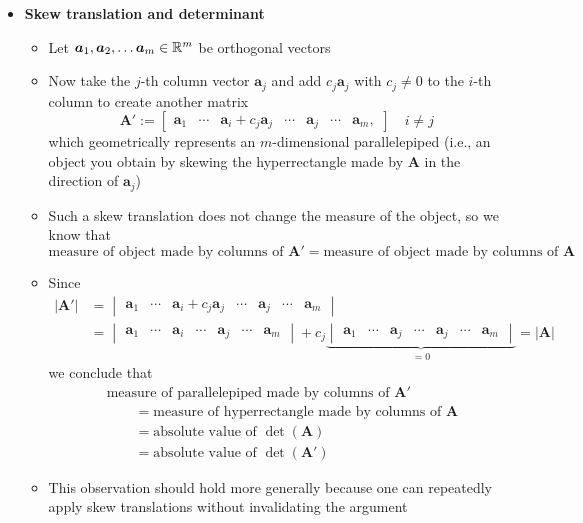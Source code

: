 \documentclass[12pt,a4paper]{article}
\begin{document}
\begin{itemize}
\item \textbf{Skew translation and determinant}
  \begin{itemize}
  \item Let $\bm{a}_{1}, \bm{a}_{2},\ldots \bm{a}_{m} \in \mathbb{R}^{m}$ be orthogonal vectors
  \item Now take the $j$-th column vector $\bm{a}_{j}$ and add $c_{j}\bm{a}_{j}$ with $c_{j}\neq 0$ to the $i$-th column to create another matrix
    \begin{equation}\nonumber%
      \bm{A}' := 
    \begin{bmatrix}
      \bm{a}_{1} & \cdots & \bm{a}_{i} + c_{j}\bm{a}_{j} & \cdots & \bm{a}_{j} & \cdots & \bm{a}_{m},
    \end{bmatrix}
    \quad i \neq j
    \end{equation}
    which geometrically represents an $m$-dimensional parallelepiped (i.e., an object you obtain by skewing the hyperrectangle made by $\bm{A}$ in the direction of $\bm{a}_{j}$)
  \item Such a skew translation does not change the measure of the object, so we know that
    \begin{equation}\nonumber%
      \text{measure of object made by columns of $\bm{A}'$}
      = \text{measure of object made by columns of $\bm{A}$}
    \end{equation}
  \item Since
    \begin{align}
      |\bm{A}'|
      & =
        \begin{vmatrix}
          \bm{a}_{1} & \cdots & \bm{a}_{i} + c_{j}\bm{a}_{j} & \cdots & \bm{a}_{j} & \cdots & \bm{a}_{m}
        \end{vmatrix}
        \nonumber \\
      & =
        \begin{vmatrix}
          \bm{a}_{1} & \cdots & \bm{a}_{i} & \cdots & \bm{a}_{j} & \cdots & \bm{a}_{m}
        \end{vmatrix}
        + c_{j}
        \underbrace{
        \begin{vmatrix}
          \bm{a}_{1} & \cdots & \bm{a}_{j} & \cdots & \bm{a}_{j} & \cdots & \bm{a}_{m}
        \end{vmatrix}}_{=0}
       = |\bm{A}|
    \nonumber%
    \end{align}
    we conclude that
    \begin{align}
      &\text{measure of parallelepiped made by columns of $\bm{A}'$} \nonumber \\
        &\qquad = \text{measure of hyperrectangle made by columns of $\bm{A}$} \nonumber \\
        &\qquad = \text{absolute value of $\det(\bm{A})$}  \nonumber \\
        &\qquad = \text{absolute value of $\det(\bm{A}')$}
    \nonumber%
    \end{align}
  \item This observation should hold more generally
    because one can repeatedly apply skew translations without invalidating the argument
    

\end{itemize}
\end{itemize}
\end{document}
